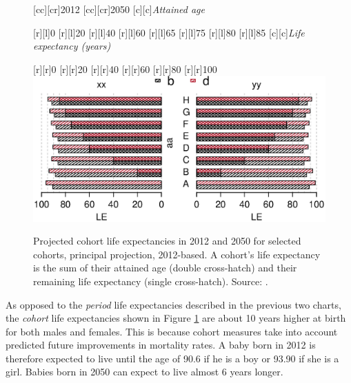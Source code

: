\documentclass[11 pt, a4paper]{report}
\begin{document}
\begin{figure}[hbtp!]
[cc][cr]{\small{2012}}
[cc][cr]{\small{2050}}
[c][c]{\small{\emph{Attained age}}}

[r][l]{\small{0}}
[r][l]{\small{20}}
[r][l]{\small{40}}
[r][l]{\small{60}}
[r][l]{\small{65}}
[r][l]{\small{75}}
[r][l]{\small{80}}
[r][l]{\small{85}}
[c][c]{\small{\emph{Life expectancy (years)}}}

[r][r]{\small{0}}
[r][r]{\small{20}}
[r][r]{\small{40}}
[r][r]{\small{60}}
[r][r]{\small{80}}
[r][r]{\small{100}}
\includegraphics[width=\textwidth]{../figures/Fig2.6.eps}
\caption{Projected cohort life expectancies in 2012 and 2050 for selected cohorts, principal projection, 2012-based. A cohort's life expectancy is the sum of their  attained age (double cross-hatch) and their remaining life expectancy (single cross-hatch). Source: \citet{ONS2013c}.}
\label{Fig:26}
\end{figure}

As opposed to the \emph{period} life expectancies described in the previous two charts, the \emph{cohort} life expectancies shown in Figure \ref{Fig:26} are about 10 years higher at birth for both males and females.  This is because cohort measures take into account predicted future improvements in mortality rates. A baby born in 2012 is therefore expected to live until the age of 90.6 if he is a boy or 93.90 if she is a girl. Babies born in 2050 can expect to live almost 6 years longer.  
\end{document}
